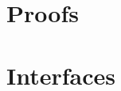 \documentclass[a4paper,11pt]{book}
\begin{document}




















\appendix

\chapter{Proofs}









\chapter{Interfaces}


\end{document}
